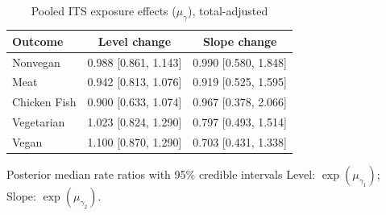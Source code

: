 \begin{table}[H]
\centering
\caption{Pooled ITS exposure effects ($\mu_\gamma$), total-adjusted}
\label{tab:a3_mu_gamma_adj}
\begin{tabular}{lcc}
\toprule
Outcome & Level change & Slope change \\
\midrule
Nonvegan & 0.988 [0.861, 1.143] & 0.990 [0.580, 1.848] \\
Meat & 0.942 [0.813, 1.076] & 0.919 [0.525, 1.595] \\
Chicken Fish & 0.900 [0.633, 1.074] & 0.967 [0.378, 2.066] \\
Vegetarian & 1.023 [0.824, 1.290] & 0.797 [0.493, 1.514] \\
Vegan & 1.100 [0.870, 1.290] & 0.703 [0.431, 1.338] \\
\bottomrule
\end{tabular}
\par\smallskip\footnotesize Posterior median rate ratios with 95\% credible intervals Level: $\exp(\mu_{\gamma_1})$; Slope: $\exp(\mu_{\gamma_2})$.
\end{table}
